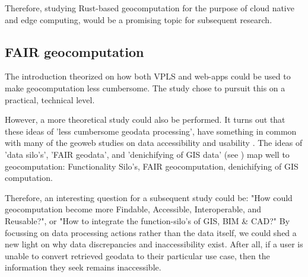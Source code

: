 Therefore, studying Rust-based geocomputation for the purpose of cloud native and edge computing, would be a promising topic for subsequent research. 

\subsection{FAIR geocomputation}

The introduction theorized on how both VPLS and web-apps could be used to make geocomputation less cumbersome.
The study chose to pursuit this on a practical, technical level. 

However, a more theoretical study could also be performed. 
It turns out that these ideas of 'less cumbersome geodata processing', have something in common with many of the geoweb studies on data accessibility and usability \citep{brink_geospatial_2018}.
The ideas of 'data silo's', 'FAIR geodata', and 'denichifying of \ac{GIS} data' (see \citet{brink_geospatial_2018}) map well to geocomputation:
Functionality Silo's, FAIR geocomputation, denichifying of \ac{GIS} computation. 

Therefore, an interesting question for a subsequent study could be: "How could geocomputation become more Findable, Accessible, Interoperable, and Reusable?", or "How to integrate the function-silo's of GIS, BIM \& CAD?"
By focussing on data processing actions rather than the data itself, we could shed a new light on why data discrepancies and inaccessibility exist. 
After all, if a user is unable to convert retrieved geodata to their particular use case, then the information they seek remains inaccessible.







  

